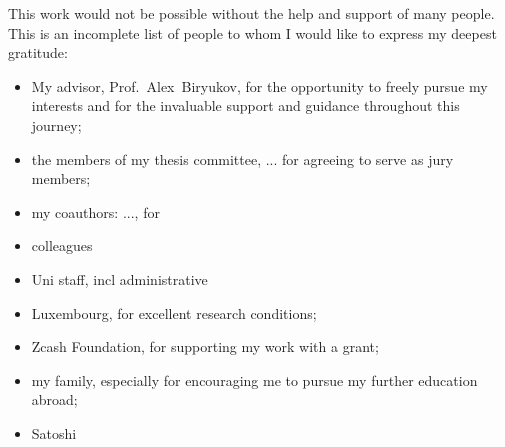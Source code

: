 
\begin{acknowledgements}
\addchaptertocentry{\acknowledgementname} %
This work would not be possible without the help and support of many people.
This is an incomplete list of people to whom I would like to express my deepest gratitude:
\begin{itemize}
	\item My advisor, Prof.~Alex~Biryukov, for the opportunity to freely pursue my interests and for the invaluable support and guidance throughout this journey;
	\item the members of my thesis committee, ... for agreeing to serve as jury members;
	\item my coauthors: ..., for 
	\item colleagues
	\item Uni staff, incl administrative
	\item Luxembourg, for excellent research conditions;
	\item Zcash Foundation, for supporting my work with a grant;
	\item my family, especially for encouraging me to pursue my further education abroad;
	\item Satoshi
\end{itemize}
\end{acknowledgements}


\tableofcontents %

\listoffigures %

\listoftables %


